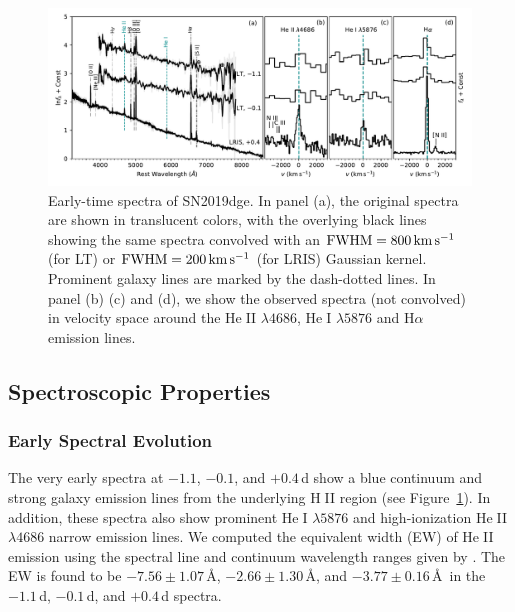\documentclass[twocolumn]{aastex63}
\newcommand{\name}{SN2019dge}
\def\ion#1#2{#1$\;${\footnotesize\rm{#2}}\relax}
\begin{document}
\begin{CJK*}{UTF8}{gbsn}
\begin{figure}[htbp!]
	\centering
	\includegraphics[width=\textwidth]{figures/spectra_early.pdf}
	\caption{Early-time spectra of \name.  In panel (a), the original spectra are	
		shown in translucent colors, with the overlying black lines showing the same spectra convolved 
		with an ${\rm FWHM} = 800\, {\rm km\, s^{-1}}$ (for LT)  or ${\rm FWHM} = 200\, {\rm km\, 
			s^{-1}}$ (for LRIS) Gaussian kernel. Prominent galaxy lines are marked by the 
		dash-dotted lines. In panel (b) (c) and (d), we show the observed spectra (not convolved) in 
		velocity space around the \ion{He}{II} $\lambda 4686$, \ion{He}{I} $\lambda 5876$ and 
		H$\alpha$ emission lines.
		\label{fig:spectra_early}}
\end{figure}

\subsection{Spectroscopic Properties}\label{subsec:spec_properties}


\subsubsection{Early Spectral Evolution} \label{subsubsec:spec_early}
The very early spectra at $-1.1$, $-0.1$, and $+0.4$\,d show a blue continuum and strong galaxy 
emission lines from the underlying \ion{H}{II} region (see Figure~\ref{fig:spectra_early}). In 
addition, these spectra also show prominent \ion{He}{I} $\lambda5876$ and high-ionization \ion{He}{II} 
$\lambda4686$ narrow emission lines. We computed the equivalent width (EW) of \ion{He}{II} emission 
using the spectral line and continuum wavelength ranges given by \citet{Khazov2016}. The EW is found 
to be $-7.56\pm 1.07$\,\AA, $-2.66\pm 1.30$\,\AA, and $-3.77\pm 0.16$\,\AA\ in the $-1.1$\,d, 
$-0.1$\,d, and $+0.4$\,d spectra. 


\end{CJK*}
\end{document}
